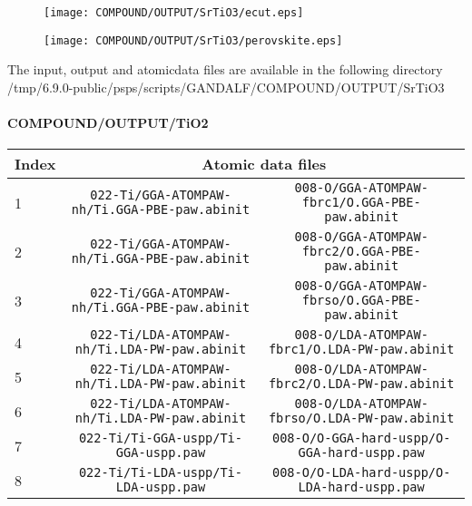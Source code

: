 \documentclass[onecolumn]{revtex4}
\begin{document}
\begin{figure}[h] 
\centering 
\texttt{[image: COMPOUND/OUTPUT/SrTiO3/ecut.eps]}
\end{figure}
\begin{figure}[h] 
\centering 
\texttt{[image: COMPOUND/OUTPUT/SrTiO3/perovskite.eps]}
\end{figure}
\begin{htmlonly} 
The input, output and atomicdata files are available in the following directory 
  {/tmp/6.9.0-public/psps/scripts/GANDALF/COMPOUND/OUTPUT/SrTiO3} 
\end{htmlonly} 
\newpage
\paragraph*{\bf{COMPOUND/OUTPUT/TiO2}}
\begin{center}
\begin{tabular}{lcc}
\hline
Index & \multicolumn{2}{c}{Atomic data files} \\
\hline
1 & \verb?022-Ti/GGA-ATOMPAW-nh/Ti.GGA-PBE-paw.abinit? & \verb?008-O/GGA-ATOMPAW-fbrc1/O.GGA-PBE-paw.abinit? \\
2 & \verb?022-Ti/GGA-ATOMPAW-nh/Ti.GGA-PBE-paw.abinit? & \verb?008-O/GGA-ATOMPAW-fbrc2/O.GGA-PBE-paw.abinit? \\
3 & \verb?022-Ti/GGA-ATOMPAW-nh/Ti.GGA-PBE-paw.abinit? & \verb?008-O/GGA-ATOMPAW-fbrso/O.GGA-PBE-paw.abinit? \\
4 & \verb?022-Ti/LDA-ATOMPAW-nh/Ti.LDA-PW-paw.abinit? & \verb?008-O/LDA-ATOMPAW-fbrc1/O.LDA-PW-paw.abinit? \\
5 & \verb?022-Ti/LDA-ATOMPAW-nh/Ti.LDA-PW-paw.abinit? & \verb?008-O/LDA-ATOMPAW-fbrc2/O.LDA-PW-paw.abinit? \\
6 & \verb?022-Ti/LDA-ATOMPAW-nh/Ti.LDA-PW-paw.abinit? & \verb?008-O/LDA-ATOMPAW-fbrso/O.LDA-PW-paw.abinit? \\
7 & \verb?022-Ti/Ti-GGA-uspp/Ti-GGA-uspp.paw? & \verb?008-O/O-GGA-hard-uspp/O-GGA-hard-uspp.paw? \\
8 & \verb?022-Ti/Ti-LDA-uspp/Ti-LDA-uspp.paw? & \verb?008-O/O-LDA-hard-uspp/O-LDA-hard-uspp.paw? \\
\hline
\end{tabular}
\end{center}
\end{document}
